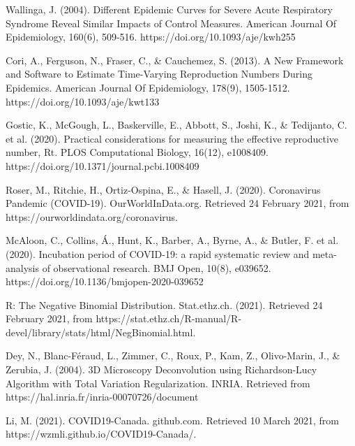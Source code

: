 \documentclass{article}
\begin{document}
\begin{thebibliography}{2}

Wallinga, J. (2004). Different Epidemic Curves for Severe Acute Respiratory Syndrome Reveal Similar Impacts of Control Measures. American Journal Of Epidemiology, 160(6), 509-516. https://doi.org/10.1093/aje/kwh255

Cori, A., Ferguson, N., Fraser, C., \& Cauchemez, S. (2013). A New Framework and Software to Estimate Time-Varying Reproduction Numbers During Epidemics. American Journal Of Epidemiology, 178(9), 1505-1512. https://doi.org/10.1093/aje/kwt133

Gostic, K., McGough, L., Baskerville, E., Abbott, S., Joshi, K., \& Tedijanto, C. et al. (2020). Practical considerations for measuring the effective reproductive number, Rt. PLOS Computational Biology, 16(12), e1008409. https://doi.org/10.1371/journal.pcbi.1008409


Roser, M., Ritchie, H., Ortiz-Ospina, E., \& Hasell, J. (2020). Coronavirus Pandemic (COVID-19). OurWorldInData.org. Retrieved 24 February 2021, from https://ourworldindata.org/coronavirus.

McAloon, C., Collins, Á., Hunt, K., Barber, A., Byrne, A., \& Butler, F. et al. (2020). Incubation period of COVID-19: a rapid systematic review and meta-analysis of observational research. BMJ Open, 10(8), e039652. https://doi.org/10.1136/bmjopen-2020-039652


R: The Negative Binomial Distribution. Stat.ethz.ch. (2021). Retrieved 24 February 2021, from https://stat.ethz.ch/R-manual/R-devel/library/stats/html/NegBinomial.html.

Dey, N., Blanc-Féraud, L., Zimmer, C., Roux, P., Kam, Z., Olivo-Marin, J., \& Zerubia, J. (2004). 3D Microscopy Deconvolution using Richardson-Lucy Algorithm with Total Variation Regularization. INRIA. Retrieved from https://hal.inria.fr/inria-00070726/document

Li, M. (2021). COVID19-Canada. github.com. Retrieved 10 March 2021, from https://wzmli.github.io/COVID19-Canada/.
    


\end{thebibliography}
\end{document}
